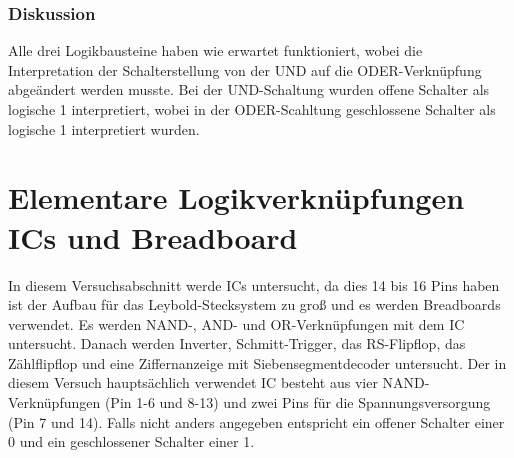 \documentclass[12pt,a4paper]{article}
\begin{document}
\subsubsection*{Diskussion}

Alle drei Logikbausteine haben wie erwartet funktioniert, wobei die Interpretation der Schalterstellung von der UND auf die ODER-Verknüpfung abgeändert werden musste. Bei der UND-Schaltung wurden offene Schalter als logische 1 interpretiert, wobei in der ODER-Scahltung geschlossene Schalter als logische 1 interpretiert wurden. 

\section{Elementare Logikverknüpfungen ICs und Breadboard}

In diesem Versuchsabschnitt werde ICs untersucht, da dies 14 bis 16 Pins haben ist der Aufbau für das Leybold-Stecksystem zu groß und es werden Breadboards verwendet. Es werden NAND-, AND- und OR-Verknüpfungen mit dem IC untersucht. Danach werden Inverter, Schmitt-Trigger, das RS-Flipflop, das Zählflipflop und eine Ziffernanzeige mit Siebensegmentdecoder untersucht. Der in diesem Versuch hauptsächlich verwendet IC besteht aus vier NAND-Verknüpfungen (Pin 1-6 und 8-13) und zwei Pins für die Spannungsversorgung (Pin 7 und 14). Falls nicht anders angegeben entspricht ein offener Schalter einer 0 und ein geschlossener Schalter einer 1.
\end{document}
